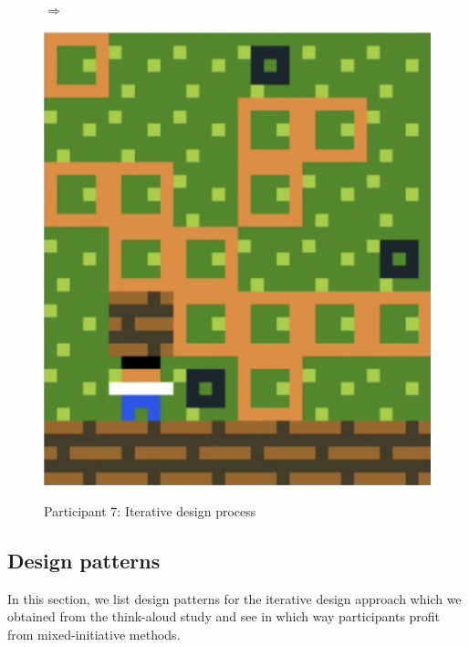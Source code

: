 \begin{figure}[!htbp]
\begin{minipage}[t]{0.2\textwidth}
\end{minipage}
$\Longrightarrow$
\begin{minipage}[t]{0.2\textwidth}
\includegraphics[width=\textwidth]{figures/p8greenc.png} \hfill \\
\end{minipage}

\caption{Participant 7: Iterative design process}
\end{figure}


\subsection{Design patterns}

In this section, we list design patterns for the iterative design approach which we obtained from the think-aloud study and see in which way participants profit from mixed-initiative methods.

